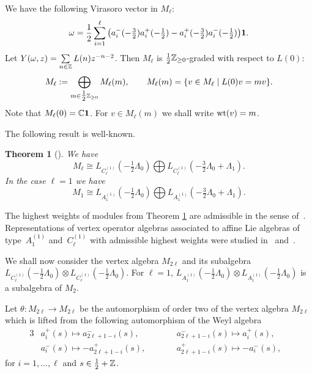 \documentclass[11pt]{article}
\newtheorem{theorem}{Theorem}
\newcommand{\Z}{\Bbb Z}
\newcommand{\Zp} {\Z _ {\ge 0} }
\newcommand{\C}{\Bbb C}
\newcommand{\1}{\bf 1}
\newcommand{\wt}{{\rm {wt} }   }
\begin{document}
We have the following Virasoro vector in $M_{\ell}$:
\begin{gather} \label{vir-bos}  \omega=\frac{1}{2} \sum_{i=1} ^{\ell} \big( a_i
^-  (- \tfrac{3}{2} ) a_i ^{+}  (-\tfrac{1}{2}  ) -a_i ^+  (-  \tfrac{3}{2} )
a_i ^{-} (-\tfrac{1}{2}  ) \big) {\1}.
\end{gather}
Let $Y(\omega,z) = \sum\limits_{n \in {\Z} } L(n) z ^{-n-2}$.
Then $M_{\ell}$ is $\tfrac{1}{2}{\Zp}$-graded with respect to
$L(0)$:
\[ M_{\ell} := \bigoplus_{ m \in \tfrac{1}{2} \Zp} M_{\ell} (m),
\qquad M_{\ell} (m)= \{ v \in M_{\ell} \; \vert \;  L(0) v = m v \}.\]
Note that $M_{\ell} (0) = {\C} {\1}$. For $ v \in M_{\ell} (m)$ we
shall write $\wt (v) = m$.

The following result is well-known.

\begin{theorem}[\cite{FF}] \label{ff}
We have
\[  M_{\ell} \cong L_{C_{\ell} ^{(1)}}( -\tfrac{1}{2}\Lambda _{0})
\bigoplus L_{C_{\ell} ^{(1)}}( -\tfrac{3}{2}\Lambda _{0} +
\Lambda_1). \]
In the case $\ell =1$ we have \[  M_1 \cong L_{A_1 ^{(1)}}(
-\tfrac{1}{2}\Lambda _{0}) \bigoplus L_{A_1 ^{(1)}}(
-\tfrac{3}{2}\Lambda _{0} + \Lambda_1). \]
\end{theorem}

\begin{remark} The highest weights of modules from Theorem \ref{ff}
are admissible in the sense of~\cite{KW}. Representations of vertex
operator algebras associated to af\/f\/ine Lie algebras of type~$A_1
^{(1)}$ and~$C_{\ell} ^{(1)}$ with admissible highest weights were
studied in~\cite{AM} and~\cite{A-1994}.
\end{remark}

We shall now consider the vertex algebra $M_{2 \ell}$ and its
subalgebra $L_{C_{\ell} ^{(1)}}( -\tfrac{1}{2}\Lambda _{0}) \otimes
L_{C_{\ell} ^{(1)}}( -\tfrac{1}{2}\Lambda _{0})$. For $\ell =1$,
$L_{A_1 ^{(1)}}(-\tfrac{1}{2}\Lambda_0) \otimes L_{A_1
^{(1)}}(-\tfrac{1}{2}\Lambda_0)$ is a subalgebra of $M_{2}$.





Let $\theta : M_{2 \ell} \rightarrow M_{2 \ell}$ be the automorphism
of order two of  the vertex algebra $M_{2 \ell}$ which is lifted
from the following automorphism of the Weyl algebra
\begin{alignat*}{3}
& a_{i} ^+ (s) \mapsto  a_{2\ell+1-i} ^{-} (s), \qquad
&& a_{2\ell+1-i} ^- (s) \mapsto  a_{i} ^{+} (s), &  \\
& a_{i} ^-(s) \mapsto - a_{2\ell+1-i} ^+ (s), \qquad && a_{2\ell+1-i}
^+(s) \mapsto - a_{i} ^- (s), &
 \end{alignat*}
for $i =1, \dots, \ell$ and  $s \in \tfrac{1}{2} + {\Z}$.
\end{document}
